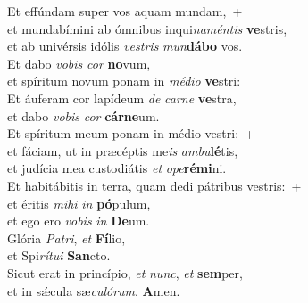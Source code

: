 \evenverse Et effúndam super vos aquam mundam,~+\\\evenverse  et mundabímini ab ómnibus inqui\textit{na}\textit{mén}\textit{tis} \textbf{ve}stris,~\*\\
\evenverse et ab univérsis idólis \textit{ve}\textit{stris} \textit{mun}\textbf{dá}\textbf{bo} vos.\\
\oddverse Et dabo \textit{vo}\textit{bis} \textit{cor} \textbf{no}vum,~\*\\
\oddverse et spíritum novum ponam in \textit{mé}\textit{di}\textit{o} \textbf{ve}stri:\\
\evenverse Et áuferam cor lapídeum \textit{de} \textit{car}\textit{ne} \textbf{ve}stra,~\*\\
\evenverse et dabo \textit{vo}\textit{bis} \textit{cor} \textbf{cár}\textbf{ne}um.\\
\oddverse Et spíritum meum ponam in médio vestri:~+\\
\oddverse  et fáciam, ut in præcéptis me\textit{is} \textit{am}\textit{bu}\textbf{lé}tis,~\*\\
\oddverse et judícia mea custodiátis \textit{et} \textit{o}\textit{pe}\textbf{ré}\textbf{mi}ni.\\
\evenverse Et habitábitis in terra, quam dedi pátribus vestris:~+\\
\evenverse  et éritis \textit{mi}\textit{hi} \textit{in} \textbf{pó}pulum,~\*\\
\evenverse et ego ero \textit{vo}\textit{bis} \textit{in} \textbf{De}um.\\
\oddverse Glória \textit{Pa}\textit{tri}, \textit{et} \textbf{Fí}lio,~\*\\
\oddverse et Spi\textit{rí}\textit{tu}\textit{i} \textbf{San}cto.\\
\evenverse Sicut erat in princípio, \textit{et} \textit{nunc}, \textit{et} \textbf{sem}per,~\*\\
\evenverse et in sǽcula sæ\textit{cu}\textit{ló}\textit{rum}. \textbf{A}men.\\

